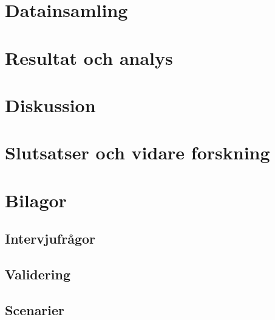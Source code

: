 \documentclass[swedish]{maucsthesis}
\begin{document}
\section{Datainsamling}\label{sec:resultat}
    
    

\section{Resultat och analys}\label{sec:analys}
    
    
    
    
    

\section{Diskussion}
    
    

\section{Slutsatser och vidare forskning}
    

\newpage
{}


\newpage
\appendix
{}
\section*{Bilagor}
\renewcommand{\thesubsection}{ \Alph{subsection}}

\subsection{Intervjufrågor}\label{subsec:intervjubilaga}

\newpage
\subsection{Validering}\label{subsec:valideringsbilaga}

\subsection{Scenarier}\label{subsec:valideringsbilaga}

\end{document}
